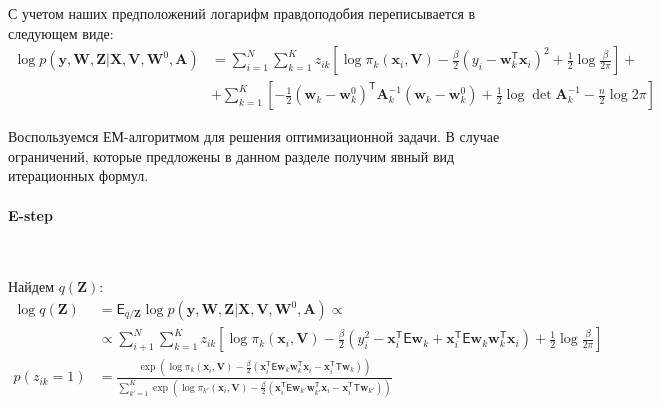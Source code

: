 \documentclass[12pt, twoside]{article}
\numberwithin{equation}{section}
\begin{document}
С учетом наших предположений логарифм правдоподобия переписывается в следующем виде:
\begin{equation}
\label{eq:st:lin:2}
\begin{aligned}
\log p\left(\textbf{y}, \textbf{W}, \textbf{Z}|\textbf{X}, \textbf{V}, \textbf{W}^{0}, \textbf{A}\right) &= \sum_{i=1}^{N}\sum_{k=1}^{K}z_{ik}\left[\log\pi_k\left(\textbf{x}_i, \textbf{V}\right) - \frac{\beta}{2}\left(y_{i} - \textbf{w}_{k}^{\mathsf{T}}\textbf{x}_{i}\right)^{2} + \frac{1}{2}\log\frac{\beta}{2\pi}\right] +\\
&+ \sum_{k=1}^{K}\left[-\frac{1}{2}\left(\textbf{w}_{k} - \textbf{w}_{k}^{0}\right)^{\mathsf{T}}\textbf{A}_{k}^{-1}\left(\textbf{w}_{k} - \textbf{w}_{k}^{0}\right) + \frac{1}{2}\log\det\textbf{A}^{-1}_{k} - \frac{n}{2}\log2\pi\right]
\end{aligned}
\end{equation}

Воспользуемся ЕМ-алгоритмом для решения оптимизационной задачи. В случае ограничений, которые предложены в данном разделе получим явный вид итерационных формул.

\paragraph{E-step}~

Найдем $q\left(\textbf{Z}\right)$:
\begin{equation}
\label{eq:st:lin:3}
\begin{aligned}
\log q\left(\textbf{Z}\right) &= \mathsf{E}_{q/\textbf{Z}}\log p\left(\textbf{y}, \textbf{W}, \textbf{Z}|\textbf{X}, \textbf{V}, \textbf{W}^{0}, \textbf{A}\right)  \propto\\
&\propto \sum_{i+1}^{N}\sum_{k=1}^{K}z_{ik}\left[\log\pi_{k}\left(\textbf{x}_{i}, \textbf{V}\right) - \frac{\beta}{2}\left(y_{i}^{2} -\textbf{x}_{i}^{\mathsf{T}}\mathsf{E}\textbf{w}_{k} + \textbf{x}_{i}^{\mathsf{T}}\mathsf{E}\textbf{w}_{k}\textbf{w}_{k}^{\mathsf{T}}\textbf{x}_{i}\right) + \frac{1}{2}\log\frac{\beta}{2\pi}\right]\\
p\left(z_{ik} = 1\right) &= \frac{\exp\left(\log\pi_{k}\left(\textbf{x}_{i}, \textbf{V}\right) - \frac{\beta}{2}\left(\textbf{x}_{i}^{\mathsf{T}}\mathsf{E}\textbf{w}_{k}\textbf{w}_{k}^{\mathsf{T}}\textbf{x}_{i} - \textbf{x}_{i}^{\mathsf{T}}\mathsf{T}\textbf{w}_{k}\right)\right)}{\sum_{k'=1}^{K}\exp\left(\log\pi_{k'}\left(\textbf{x}_{i}, \textbf{V}\right) - \frac{\beta}{2}\left(\textbf{x}_{i}^{\mathsf{T}}\mathsf{E}\textbf{w}_{k'}\textbf{w}_{k'}^{\mathsf{T}}\textbf{x}_{i} - \textbf{x}_{i}^{\mathsf{T}}\mathsf{T}\textbf{w}_{k'}\right) \right)}
\end{aligned}
\end{equation}
\end{document}

